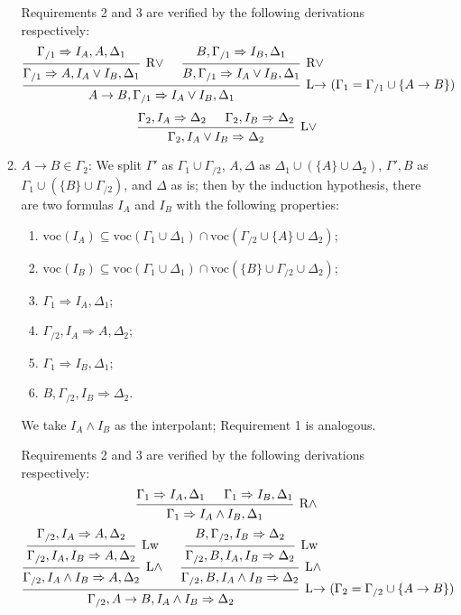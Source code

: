 \documentclass[a4paper]{article}
\newcommand{\voc}{\mathrm{voc}}
\begin{document}
\begin{itemize}
\begin{enumerate}
    Requirements 2 and 3 are verified by the following derivations respectively:
    \[
      \begin{prooftree}
        \hypo{\Gamma_{/1} \Rightarrow I_A, A, \Delta_1}
        \infer1[R$\vee$]{\Gamma_{/1} \Rightarrow A, I_A \vee I_B, \Delta_1}
        \hypo{B, \Gamma_{/1} \Rightarrow I_B, \Delta_1}
        \infer1[R$\vee$]{B,\Gamma_{/1} \Rightarrow I_A \vee I_B, \Delta_1}
        \infer2[L$\to$ ($\Gamma_1 = \Gamma_{/1} \cup \{A \to B\}$)]{A \to B, \Gamma_{/1} \Rightarrow I_A \vee I_B, \Delta_1}
      \end{prooftree}
    \]
    \[
      \begin{prooftree}
        \hypo{\Gamma_2, I_A \Rightarrow \Delta_2}
        \hypo{\Gamma_2, I_B \Rightarrow \Delta_2}
        \infer2[L$\vee$]{\Gamma_2,I_A \vee I_B \Rightarrow \Delta_2}
      \end{prooftree}
    \]
  \item $A \to B \in \Gamma_2$: We split $\Gamma'$ as $\Gamma_1 \cup \Gamma_{/2}$, $A, \Delta$ as $\Delta_1 \cup (\{A\} \cup \Delta_2)$, $\Gamma',B$ as $\Gamma_1 \cup (\{B\} \cup \Gamma_{/2})$, and $\Delta$ as is; then by the induction hypothesis, there are two formulas $I_A$ and $I_B$ with the following properties:
    \begin{enumerate}
    \item $\voc(I_A) \subseteq \voc(\Gamma_1 \cup \Delta_1) \cap \voc(\Gamma_{/2} \cup \{A\} \cup \Delta_2)$;
    \item $\voc(I_B) \subseteq \voc(\Gamma_1 \cup \Delta_1) \cap \voc(\{B\} \cup \Gamma_{/2} \cup \Delta_2)$;
    \item $\Gamma_1 \Rightarrow I_A, \Delta_1$;
    \item $\Gamma_{/2},I_A \Rightarrow A, \Delta_2$;
    \item $\Gamma_1 \Rightarrow I_B, \Delta_1$;
    \item $B, \Gamma_{/2}, I_B \Rightarrow \Delta_2$.
    \end{enumerate}
    We take $I_A \wedge I_B$ as the interpolant; Requirement 1 is analogous.

    Requirements 2 and 3 are verified by the following derivations respectively:
    \[
      \begin{prooftree}
        \hypo{\Gamma_1 \Rightarrow I_A, \Delta_1}
        \hypo{\Gamma_1 \Rightarrow I_B, \Delta_1}
        \infer2[R$\wedge$]{\Gamma_1 \Rightarrow I_A \wedge I_B, \Delta_1}
      \end{prooftree}
    \]
    \[
      \begin{prooftree}
        \hypo{\Gamma_{/2},I_A \Rightarrow A, \Delta_2}
        \infer1[Lw]{\Gamma_{/2}, I_A, I_B \Rightarrow A, \Delta_2}
        \infer1[L$\wedge$]{\Gamma_{/2}, I_A \wedge I_B \Rightarrow A, \Delta_2}
        \hypo{B, \Gamma_{/2}, I_B \Rightarrow \Delta_2}
        \infer1[Lw]{\Gamma_{/2}, B, I_A, I_B \Rightarrow \Delta_2}
        \infer1[L$\wedge$]{\Gamma_{/2}, B, I_A \wedge I_B \Rightarrow \Delta_2}
        \infer2[L$\to$ ($\Gamma_2 = \Gamma_{/2} \cup \{A \to B\}$)]{\Gamma_{/2}, A \to B, I_A \wedge I_B \Rightarrow \Delta_2}
      \end{prooftree}
    \]
  \end{enumerate}


\end{itemize}
\end{document}
